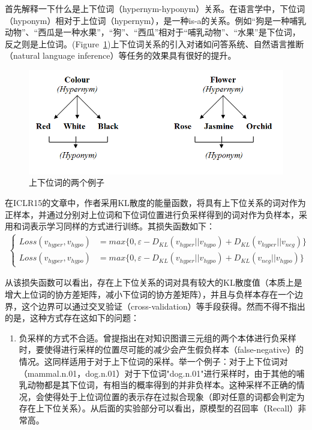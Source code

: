 \documentclass[a4paper,13pt]{article}
\begin{document}
\begin{spacing}{1.5}
首先解释一下什么是上下位词（hypernym-hyponym）关系。在语言学中，下位词（hyponym）相对于上位词（hypernym），是一种is-a的关系。例如“狗是一种哺乳动物”、“西瓜是一种水果”，“狗”、“西瓜”相对于“哺乳动物”、“水果”是下位词，反之则是上位词。(Figure\ \ref{fig:hyper})上下位词关系的引入对诸如问答系统、自然语言推断（natural language inference）等任务的效果具有很好的提升。

\begin{figure}[h]
	\includegraphics[width=\textwidth]{hypernym-hyponym.png}
	\caption{\wuhao 上下位词的两个例子}
	\centering
	\label{fig:hyper}
\end{figure}

在ICLR15的文章中，作者采用KL散度的能量函数，将具有上下位关系的词对作为正样本，并通过分别对上位词和下位词位置进行负采样得到的词对作为负样本，采用和词表示学习同样的方式进行训练。其损失函数如下：
\begin{align*}
\begin{cases}
Loss(v_{hyper}, v_{hypo}) &= max\{ 0, \varepsilon - D_{KL}(v_{hyper}||v_{hypo}) + D_{KL}(v_{hyper}||v_{neg}) \}  \\
Loss(v_{hyper}, v_{hypo}) &= max\{ 0, \varepsilon - D_{KL}(v_{hyper}||v_{hypo}) + D_{KL}(v_{neg}||v_{hypo}) \}
\end{cases}
\end{align*}

从该损失函数可以看出，存在上下位关系的词对具有较大的KL散度值（本质上是增大上位词的协方差矩阵，减小下位词的协方差矩阵），并且与负样本存在一个边界，这个边界可以通过交叉验证（cross-validation）等手段获得。然而不得不指出的是，这种方式存在这如下的问题：
\begin{enumerate}[label=\alph*)]
\item 负采样的方式不合适。\cite{he2015learning}曾提指出在对知识图谱三元组的两个本体进行负采样时，要使得进行采样的位置尽可能的减少会产生假负样本（false-negative）的情况。这同样适用于对于上下位词的采样。举一个例子：对于上下位词对（mammal.n.01，dog.n.01）对于下位词"dog.n.01"进行采样时，由于其他的哺乳动物都是其下位词，有相当的概率得到的并非负样本。这种采样不正确的情况，会使得处于上位词位置的表示存在过拟合现象（即对任意的词都会判定为存在上下位关系）。从后面的实验部分可以看出，原模型的召回率（Recall）非常高。


\end{enumerate}
\end{spacing}
\end{document}

